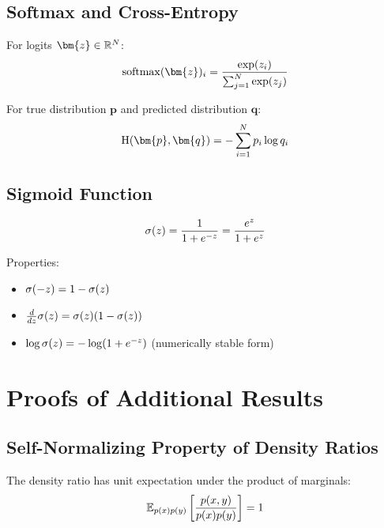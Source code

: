 \begin{notechapter}
\subsection{Softmax and Cross-Entropy}

\begin{definition}[Softmax]
For logits $\bm{z} \in \R^N$:
\begin{equation}
\softmax(\bm{z})_i = \frac{\exp(z_i)}{\sum_{j=1}^{N} \exp(z_j)}
\end{equation}
\end{definition}

\begin{definition}
For true distribution $\bm{p}$ and predicted distribution $\bm{q}$:
\begin{equation}
\Hent(\bm{p}, \bm{q}) = -\sum_{i=1}^{N} p_i \log q_i
\end{equation}
\end{definition}

\subsection{Sigmoid Function}

\begin{definition}[Sigmoid]
\begin{equation}
\sigma(z) = \frac{1}{1 + e^{-z}} = \frac{e^z}{1 + e^z}
\end{equation}
\end{definition}

Properties:
\begin{itemize}
    \item $\sigma(-z) = 1 - \sigma(z)$
    \item $\frac{d}{dz}\sigma(z) = \sigma(z)(1 - \sigma(z))$
    \item $\log \sigma(z) = -\log(1 + e^{-z})$ (numerically stable form)
\end{itemize}

\section{Proofs of Additional Results}

\subsection{Self-Normalizing Property of Density Ratios}

\begin{lemma}
\label{contrastive-rigorous:lem:density_ratio_product}
The density ratio has unit expectation under the product of marginals:
\begin{equation}
\mathbb{E}_{p(x)p(y)}\left[\frac{p(x,y)}{p(x)p(y)}\right] = 1
\end{equation}
\end{lemma}


\end{notechapter}
